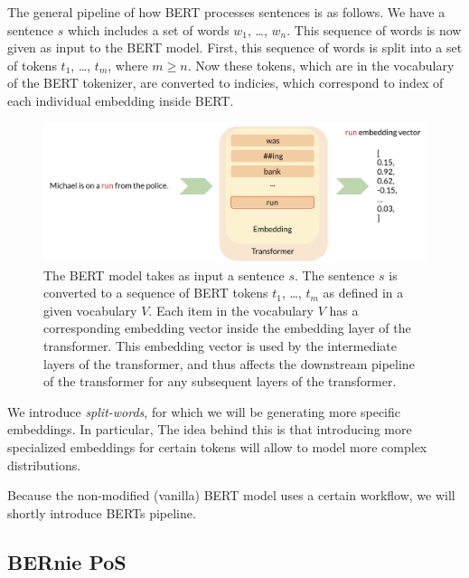 \documentclass[a4paper,12pt,twoside,openright]{report}
\begin{document}
The general pipeline of how BERT processes sentences is as follows.
We have a sentence $s$ which includes a set of words $w_1$, \ldots, $w_n$.
This sequence of words is now given as input to the BERT model.
First, this sequence of words is split into a set of tokens $t_1$, \ldots, $t_m$, where $m \geq n$.
Now these tokens, which are in the vocabulary of the BERT tokenizer, are converted to indicies, which correspond to index of each individual embedding inside BERT.



\begin{figure}[h]
	\center
  \includegraphics[width=\linewidth]{./assets/experiments/pipeline_vanilla_BERT.png}
  \caption{The BERT model takes as input a sentence $s$. The sentence $s$ is converted to a sequence of BERT tokens $t_1$, \ldots, $t_m$ as defined in a given vocabulary $V$.
Each item in the vocabulary $V$ has a corresponding embedding vector inside the embedding layer of the transformer.
This embedding vector is used by the intermediate layers of the transformer, and thus affects the downstream pipeline of the transformer for any subsequent layers of the transformer.
}
  \label{fig:BERT_vanilla_pipeline}
\end{figure}


We introduce \textit{split-words}, for which we will be generating more specific embeddings.
In particular, 
The idea behind this is that introducing more specialized embeddings for certain tokens will allow to model more complex distributions.

Because the non-modified (vanilla) BERT model uses a certain workflow, we will shortly introduce BERTs pipeline.

\subsection{BERnie PoS} \label{bernie_pos}
\end{document}
